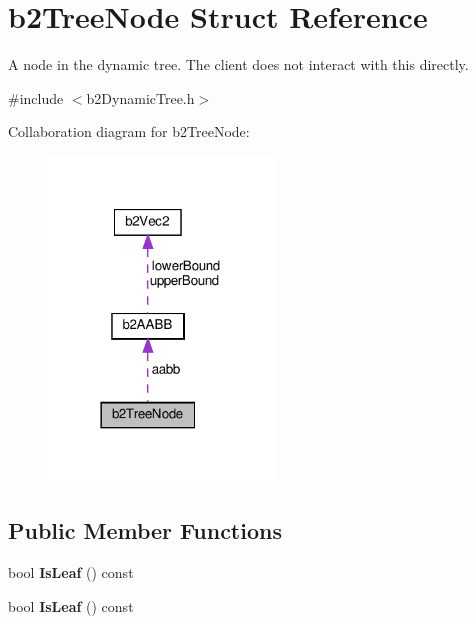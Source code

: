 \hypertarget{structb2TreeNode}{}\section{b2\+Tree\+Node Struct Reference}
\label{structb2TreeNode}


A node in the dynamic tree. The client does not interact with this directly.  




{\ttfamily \#include $<$b2\+Dynamic\+Tree.\+h$>$}



Collaboration diagram for b2\+Tree\+Node\+:
\nopagebreak
\begin{figure}[H]
\begin{center}
\leavevmode
\includegraphics[width=170pt]{structb2TreeNode__coll__graph}
\end{center}
\end{figure}
\subsection*{Public Member Functions}
\begin{DoxyCompactItemize}
\item 
\mbox{\label{structb2TreeNode_a540267ce6fa890822f1eea2d1967f646}} 
bool {\bfseries Is\+Leaf} () const
\item 
\mbox{\label{structb2TreeNode_a540267ce6fa890822f1eea2d1967f646}} 
bool {\bfseries Is\+Leaf} () const
\end{DoxyCompactItemize}
